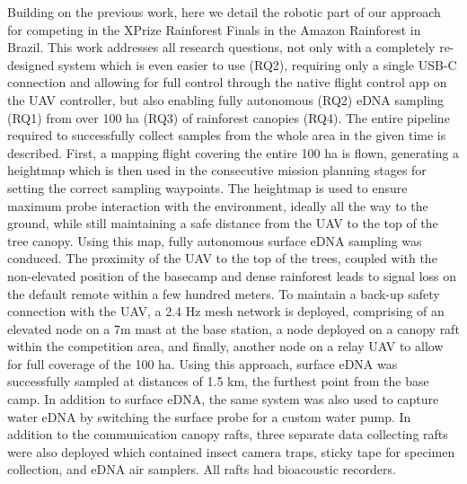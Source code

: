 Building on the previous work, here we detail the robotic part of our approach for competing in the XPrize Rainforest Finals in the Amazon Rainforest in Brazil. This work addresses all research questions, not only with a completely re-designed system which is even easier to use (RQ2), requiring only a single USB-C connection and allowing for full control through the native flight control app on the UAV controller, but also enabling fully autonomous (RQ2) eDNA sampling (RQ1) from over 100 ha (RQ3) of rainforest canopies (RQ4). The entire pipeline required to successfully collect samples from the whole area in the given time is described. First, a mapping flight covering the entire 100 ha is flown, generating a heightmap which is then used in the consecutive mission planning stages for setting the correct sampling waypoints. The heightmap is used to ensure maximum probe interaction with the environment, ideally all the way to the ground, while still maintaining a safe distance from the UAV to the top of the tree canopy. Using this map, fully autonomous surface eDNA sampling was conduced. The proximity of the UAV to the top of the trees, coupled with the non-elevated position of the basecamp and dense rainforest leads to signal loss on the default remote within a few hundred meters. To maintain a back-up safety connection with the UAV, a 2.4 Hz mesh network is deployed, comprising of an elevated node on a 7m mast at the base station, a node deployed on a canopy raft within the competition area, and finally, another node on a relay UAV to allow for full coverage of the 100 ha. Using this approach, surface eDNA was successfully sampled at distances of 1.5 km, the furthest point from the base camp. In addition to surface eDNA, the same system was also used to capture water eDNA by switching the surface probe for a custom water pump. In addition to the communication canopy rafts, three separate data collecting rafts were also deployed which contained insect camera traps, sticky tape for specimen collection, and eDNA air samplers. All rafts had bioacoustic recorders. 





